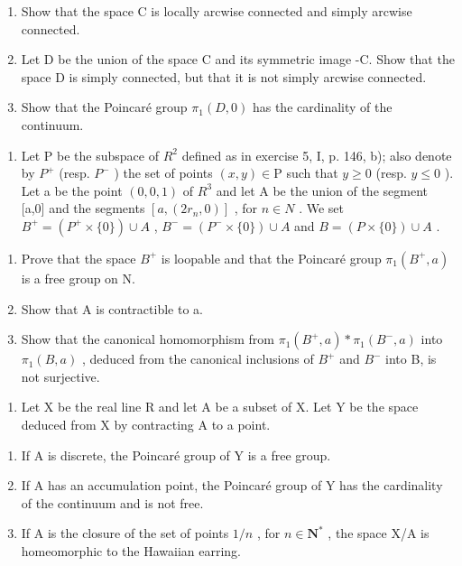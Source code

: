 \begin{enumerate}
\def\labelenumi{\alph{enumi})}
\item
  Show that the space C is locally arcwise connected and simply arcwise connected.
\item
  Let D be the union of the space C and its symmetric image -C. Show that the space D is simply connected, but that it is not simply arcwise connected.
\item
  Show that the Poincaré group \(\pi_{1}(D,0)\) has the cardinality of the continuum.
\end{enumerate}

\begin{enumerate}
\def\labelenumi{\arabic{enumi})}
\setcounter{enumi}{4}
\tightlist
\item
  Let P be the subspace of \(R^{2}\) defined as in exercise 5, I, p. 146, b); also denote by \(P^{+}\) (resp. \(P^{-}\) ) the set of points \((x,y)\in\mathrm{P}\) such that \(y\geqslant0\) (resp. \(y\leqslant0\) ). Let a be the point \((0,0,1)\) of \(R^{3}\) and let A be the union of the segment [a,0] and the segments \([a,(2r_{n},0)]\) , for \(n\in N\) . We set \(B^{+}=(P^{+}\times\{0\})\cup A\) , \(B^{-}=(P^{-}\times\{0\})\cup A\) and \(B=(P\times\{0\})\cup A\) .
\end{enumerate}

\begin{enumerate}
\def\labelenumi{\alph{enumi})}
\item
  Prove that the space \(B^{+}\) is loopable and that the Poincaré group \(\pi_{1}(B^{+}, a)\) is a free group on N.
\item
  Show that A is contractible to a.
\item
  Show that the canonical homomorphism from \(\pi_{1}(B^{+},a)*\pi_{1}(B^{-},a)\) into \(\pi_{1}(B,a)\) , deduced from the canonical inclusions of \(B^{+}\) and \(B^{-}\) into B, is not surjective.
\end{enumerate}

\begin{enumerate}
\def\labelenumi{\arabic{enumi})}
\setcounter{enumi}{5}
\tightlist
\item
  Let X be the real line R and let A be a subset of X. Let Y be the space deduced from X by contracting A to a point.
\end{enumerate}

\begin{enumerate}
\def\labelenumi{\alph{enumi})}
\item
  If A is discrete, the Poincaré group of Y is a free group.
\item
  If A has an accumulation point, the Poincaré group of Y has the cardinality of the continuum and is not free.
\item
  If A is the closure of the set of points \(1/n\) , for \(n \in \mathbf{N}^*\) , the space X/A is homeomorphic to the Hawaiian earring.
\end{enumerate}


